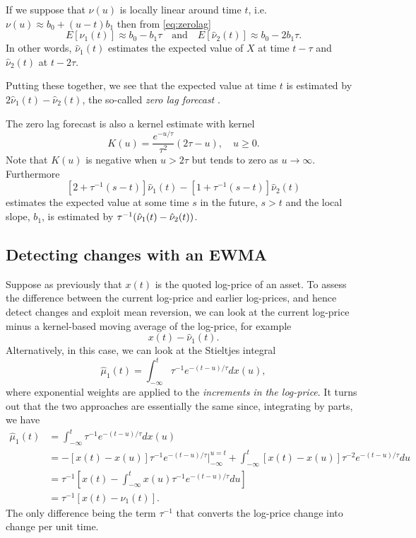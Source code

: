 If we suppose that $\nu(u)$ is locally linear around time $t$, i.e.\ $\nu(u) \approx b_0 + (u-t)b_1$ then from \eqref{eq:zerolag}
$$ E[\hat{\nu}_1(t)] \approx b_0 - b_1 \tau \quad \text{and} \quad E[\hat{\nu}_2(t)] \approx b_0 - 2 b_1 \tau.$$
In other words, $\hat{\nu}_1(t)$ estimates the expected value of $X$ at time $t-\tau$ and $\hat{\nu}_2(t)$ at $t-2\tau$.  

Putting these together, we see that the expected value at time $t$ is estimated by $2 \hat{\nu}_1(t) - \hat{\nu}_2(t)$, the so-called {\em zero lag forecast} \citep{brown2004smoothing}.  

The zero lag forecast is also a kernel estimate with kernel
$$K(u) = \frac{e^{-u/\tau}}{\tau^2} (2 \tau - u), \quad u \geqslant 0.$$
Note that $K(u)$ is negative when $u> 2 \tau$ but tends to zero as $u \to \infty$. Furthermore 
$$[2 + \tau^{-1}(s-t)]\hat{\nu}_1(t) - [1 + \tau^{-1}(s-t)]\hat{\nu}_2(t)$$ estimates the expected value at some time $s$ in the future, $s>t$ and the local slope, $b_1$, is estimated by $\tau^{-1}(\hat{\nu}_1(t) - \hat{\nu}_2(t)\textcolor{black}{)}$. 

\subsection{Detecting changes with an EWMA}
Suppose as previously that $x(t)$ is the quoted log-price of an asset. To assess the difference between the current log-price and earlier log-prices,  and hence detect changes and exploit mean reversion, we can look at the current log-price minus a kernel-based moving average of the log-price, for example 
$$x(t) - \hat{\nu}_1(t).$$
Alternatively, in this case, we can look at the Stieltjes integral
$$\hat{\mu}_1(t) = \int_{-\infty}^t \tau^{-1} e^{-(t-u)/\tau} dx(u),$$
where exponential weights are applied to the \emph{increments in the log-price}.
It turns out that the two approaches are essentially the same since, integrating by parts, we have 
\begin{align*}
\hat{\mu}_1(t) &= \int_{-\infty}^t \tau^{-1} e^{-(t-u)/\tau} dx(u) \\
&= -[x(t) - x(u)]\tau^{-1}e^{-(t-u)/\tau}|^{u=t}_{-\infty} + \int^t_{-\infty} [x(t) - x(u)]\tau^{-2}e^{-(t-u)/\tau} du\\
&= \tau^{-1}[x(t) - \int_{-\infty}^t x(u) \tau^{-1} e^{-(t-u)/\tau} du] \\
&= \tau^{-1}[x(t) - \hat{\nu}_1(t)].
\end{align*}
The only difference being the term $\tau^{-1}$ that converts the log-price change into change per unit time.

